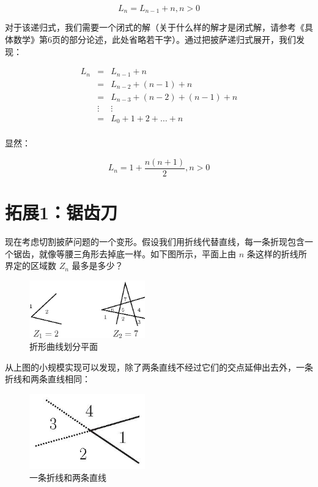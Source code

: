 \documentclass[10pt,a4paper,UTF8]{article}
\begin{document}
\begin{equation}
\label{eq:2}
L_{n} = L_{n-1} + n, n>0
\end{equation}

对于该递归式，我们需要一个闭式的解（关于什么样的解才是闭式解，请参考《具体数学》第6页的部分论述，此处省略若干字）。通过把披萨递归式展开，我们发现：

\begin{eqnarray}
\label{eq:3}
L_{n} &=& L_{n-1} +n \\
&=& L_{n-2} + (n-1) + n \\
&=& L_{n-3} + (n-2) + (n-1) + n \\
&\vdots& \vdots \\
&=& L_{0} + 1 + 2 + \ldots + n \\
\end{eqnarray}

显然：

\begin{equation}
\label{eq:4}
L_{n} = 1 + \frac{n(n+1)}{2} ,n > 0
\end{equation}

\section{拓展1：锯齿刀}
\label{sec:orgheadline4}

现在考虑切割披萨问题的一个变形。假设我们用折线代替直线，每一条折现包含一个锯齿，就像等腰三角形去掉底一样。如下图所示，平面上由 \(n\) 条这样的折线所界定的区域数 \(Z_{n}\) 最多是多少？

\begin{figure}[htb]
\centering
\includegraphics[width=5cm]{../../img/pissaz.jpg}
\caption{折形曲线划分平面}
\end{figure}

从上图的小规模实现可以发现，除了两条直线不经过它们的交点延伸出去外，一条折线和两条直线相同：

\begin{figure}[htb]
\centering
\includegraphics[width=5cm]{../../img/zigzag.jpg}
\caption{一条折线和两条直线}
\end{figure}
\end{document}
